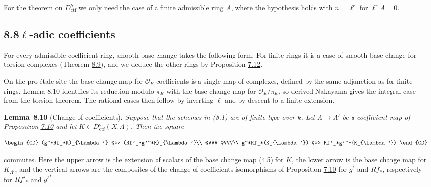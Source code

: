 \documentclass[11pt]{article}
\newenvironment{bpstatement}[2]{\par\addvspace{0.6\baselineskip}\noindent\textbf{#1}#2\textbf{.}\enspace\ignorespaces}
  {\par\addvspace{0.4\baselineskip}}
\newenvironment{bpstatementit}[2]{\begin{bpstatement}{#1}{#2}\itshape\ignorespaces}{\end{bpstatement}}
\begin{document}
\label{bp676}%
For the theorem on \(D^b_{\mathrm{ctf}}\) we only need the case of a finite admissible ring \(A\), where the hypothesis holds with \(n=\ell^r\) for \(\ell^rA=0\).


\subsection*{\texorpdfstring{8.8\quad $\ell$-adic coefficients}{8.8 ell-adic coefficients}}
\label{bp677}%
\label{bp678}%
For every admissible coefficient ring, smooth base change takes the following form. For finite rings it is a case of smooth base change for torsion complexes (Theorem \hyperref[bp674]{8.9}), and we deduce the other rings by Proposition \hyperref[bp634]{7.12}.

On the pro-étale site the base change map for \(\mathcal O_E\)-coefficients is a single map of complexes, defined by the same adjunction as for finite rings. Lemma \hyperref[bp679]{8.10} identifies its reduction modulo \(\pi_E\) with the base change map for \(\mathcal O_E/\pi_E\), so derived Nakayama gives the integral case from the torsion theorem. The rational cases then follow by inverting \(\ell\) and by descent to a finite extension.

\label{bp679}%
\begin{bpstatementit}{Lemma~8.10}{ (Change of coefficients)}
Suppose that the schemes in (8.1) are of finite type over \(k\). Let \(\Lambda\to\Lambda'\) be a coefficient map of Proposition \hyperref[bp626]{7.10} and let \(K\in D^b_{\mathrm{ctf}}(X,\Lambda)\). Then the square

\[
\begin{CD}
(g^*Rf_*K)_{\Lambda'} @>>> (Rf'_*g'^*K)_{\Lambda'}\\
@VVV @VVV\\
g^*Rf_*(K_{\Lambda'}) @>>> Rf'_*g'^*(K_{\Lambda'})
\end{CD}
\]

commutes. Here the upper arrow is the extension of scalars of the base change map (4.5) for \(K\), the lower arrow is the base change map for \(K_{\Lambda'}\), and the vertical arrows are the composites of the change-of-coefficients isomorphisms of Proposition \hyperref[bp626]{7.10} for \(g^*\) and \(Rf_*\), respectively for \(Rf'_*\) and \(g'^*\).
\end{bpstatementit}
\end{document}
